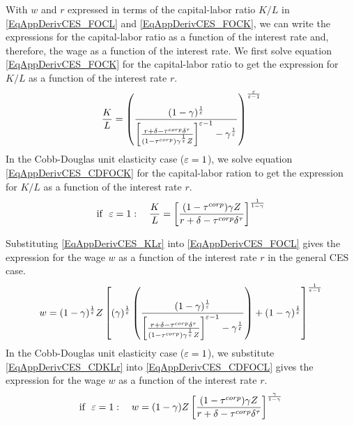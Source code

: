     With $w$ and $r$ expressed in terms of the capital-labor ratio $K/L$ in \eqref{EqAppDerivCES_FOCL} and \eqref{EqAppDerivCES_FOCK}, we can write the expressions for the capital-labor ratio as a function of the interest rate and, therefore, the wage as a function of the interest rate. We first solve equation \eqref{EqAppDerivCES_FOCK} for the capital-labor ratio to get the expression for $K/L$ as a function of the interest rate $r$.
    \begin{equation}\label{EqAppDerivCES_KLr}
      \frac{K}{L} = \left(\frac{(1-\gamma)^\frac{1}{\varepsilon}}{\left[\frac{r + \delta - \tau^{corp}\delta^\tau}{(1 - \tau^{corp})\gamma^\frac{1}{\varepsilon}Z}\right]^{\varepsilon-1} - \gamma^\frac{1}{\varepsilon}}\right)^\frac{\varepsilon}{\varepsilon-1}
    \end{equation}
    In the Cobb-Douglas unit elasticity case ($\varepsilon=1$), we solve equation \eqref{EqAppDerivCES_CDFOCK} for the capital-labor ration to get the expression for $K/L$ as a function of the interest rate $r$.
    \begin{equation}\label{EqAppDerivCES_CDKLr}
      \text{if}\:\:\:\varepsilon=1:\quad \frac{K}{L} = \left[\frac{(1 - \tau^{corp})\gamma Z}{r + \delta - \tau^{corp}\delta^\tau}\right]^\frac{1}{1-\gamma}
    \end{equation}

    Substituting \eqref{EqAppDerivCES_KLr} into \eqref{EqAppDerivCES_FOCL} gives the expression for the wage $w$ as a function of the interest rate $r$ in the general CES case.
    \begin{equation}\label{EqAppDerivCES_wr}
      w = (1-\gamma)^\frac{1}{\varepsilon}Z\left[(\gamma)^\frac{1}{\varepsilon}\left(\frac{(1-\gamma)^\frac{1}{\varepsilon}}{\left[\frac{r + \delta - \tau^{corp}\delta^\tau}{(1 - \tau^{corp})\gamma^\frac{1}{\varepsilon}Z}\right]^{\varepsilon-1} - \gamma^\frac{1}{\varepsilon}}\right) + (1-\gamma)^\frac{1}{\varepsilon}\right]^\frac{1}{\varepsilon-1}
    \end{equation}
    In the Cobb-Douglas unit elasticity case ($\varepsilon=1$), we substitute \eqref{EqAppDerivCES_CDKLr} into \eqref{EqAppDerivCES_CDFOCL} gives the expression for the wage $w$ as a function of the interest rate $r$.
    \begin{equation}\label{EqAppDerivCES_CDwr}
      \text{if}\:\:\:\varepsilon=1:\quad w = (1-\gamma)Z\left[\frac{(1 - \tau^{corp})\gamma Z}{r + \delta - \tau^{corp}\delta^\tau}\right]^\frac{\gamma}{1-\gamma}
    \end{equation}
